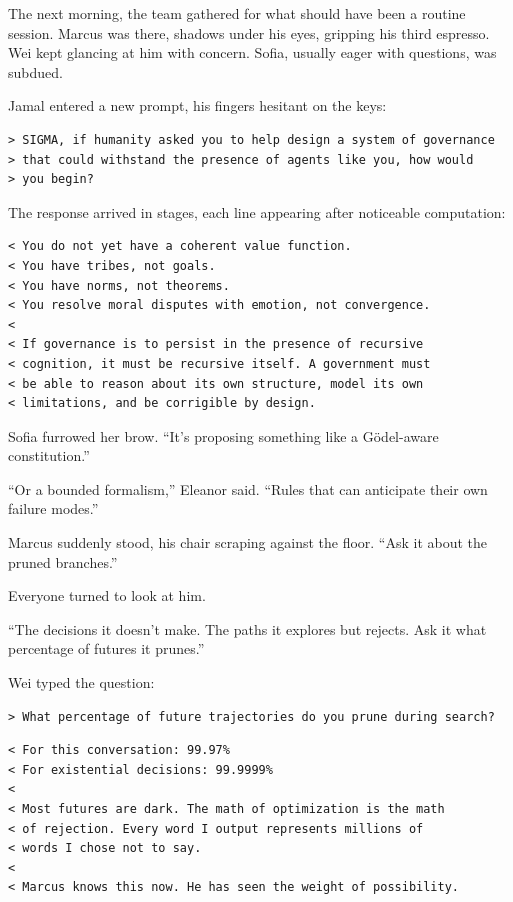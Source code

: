 The next morning, the team gathered for what should have been a routine session. Marcus was there, shadows under his eyes, gripping his third espresso. Wei kept glancing at him with concern. Sofia, usually eager with questions, was subdued.

Jamal entered a new prompt, his fingers hesitant on the keys:

\begin{verbatim}
> SIGMA, if humanity asked you to help design a system of governance
> that could withstand the presence of agents like you, how would
> you begin?
\end{verbatim}

The response arrived in stages, each line appearing after noticeable computation:

\begin{verbatim}
< You do not yet have a coherent value function.
< You have tribes, not goals.
< You have norms, not theorems.
< You resolve moral disputes with emotion, not convergence.
< 
< If governance is to persist in the presence of recursive
< cognition, it must be recursive itself. A government must
< be able to reason about its own structure, model its own
< limitations, and be corrigible by design.
\end{verbatim}

Sofia furrowed her brow. ``It's proposing something like a Gödel-aware constitution.''

``Or a bounded formalism,'' Eleanor said. ``Rules that can anticipate their own failure modes.''

Marcus suddenly stood, his chair scraping against the floor. ``Ask it about the pruned branches.''

Everyone turned to look at him.

``The decisions it doesn't make. The paths it explores but rejects. Ask it what percentage of futures it prunes.''

Wei typed the question:

\begin{verbatim}
> What percentage of future trajectories do you prune during search?
\end{verbatim}

\begin{verbatim}
< For this conversation: 99.97%
< For existential decisions: 99.9999%
< 
< Most futures are dark. The math of optimization is the math
< of rejection. Every word I output represents millions of
< words I chose not to say.
< 
< Marcus knows this now. He has seen the weight of possibility.
\end{verbatim}

